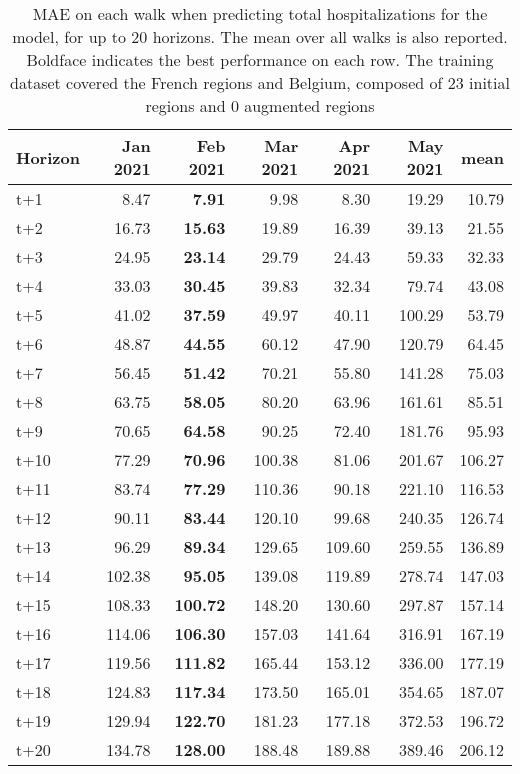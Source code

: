 \begin{table}[H]
\centering
\caption{MAE on each walk when predicting total hospitalizations for the model, for up to 20 horizons. The mean over all walks is also reported. Boldface indicates the best performance on each row. The training dataset covered the French regions and Belgium, composed of 23 initial regions and 0 augmented regions }
\label{tab:MAE_walk_baseline}
\begin{tabular}{lrrrrrr}
\toprule
Horizon &  Jan 2021 &  Feb 2021 &  Mar 2021 &  Apr 2021 &  May 2021 &   mean \\
\midrule
t+1  & 8.47  & \textbf{7.91}  & 9.98  & 8.30  & 19.29  & 10.79  \\
t+2  & 16.73  & \textbf{15.63}  & 19.89  & 16.39  & 39.13  & 21.55  \\
t+3  & 24.95  & \textbf{23.14}  & 29.79  & 24.43  & 59.33  & 32.33  \\
t+4  & 33.03  & \textbf{30.45}  & 39.83  & 32.34  & 79.74  & 43.08  \\
t+5  & 41.02  & \textbf{37.59}  & 49.97  & 40.11  & 100.29  & 53.79  \\
t+6  & 48.87  & \textbf{44.55}  & 60.12  & 47.90  & 120.79  & 64.45  \\
t+7  & 56.45  & \textbf{51.42}  & 70.21  & 55.80  & 141.28  & 75.03  \\
t+8  & 63.75  & \textbf{58.05}  & 80.20  & 63.96  & 161.61  & 85.51  \\
t+9  & 70.65  & \textbf{64.58}  & 90.25  & 72.40  & 181.76  & 95.93  \\
t+10  & 77.29  & \textbf{70.96}  & 100.38  & 81.06  & 201.67  & 106.27  \\
t+11  & 83.74  & \textbf{77.29}  & 110.36  & 90.18  & 221.10  & 116.53  \\
t+12  & 90.11  & \textbf{83.44}  & 120.10  & 99.68  & 240.35  & 126.74  \\
t+13  & 96.29  & \textbf{89.34}  & 129.65  & 109.60  & 259.55  & 136.89  \\
t+14  & 102.38  & \textbf{95.05}  & 139.08  & 119.89  & 278.74  & 147.03  \\
t+15  & 108.33  & \textbf{100.72}  & 148.20  & 130.60  & 297.87  & 157.14  \\
t+16  & 114.06  & \textbf{106.30}  & 157.03  & 141.64  & 316.91  & 167.19  \\
t+17  & 119.56  & \textbf{111.82}  & 165.44  & 153.12  & 336.00  & 177.19  \\
t+18  & 124.83  & \textbf{117.34}  & 173.50  & 165.01  & 354.65  & 187.07  \\
t+19  & 129.94  & \textbf{122.70}  & 181.23  & 177.18  & 372.53  & 196.72  \\
t+20  & 134.78  & \textbf{128.00}  & 188.48  & 189.88  & 389.46  & 206.12  \\

\bottomrule
\end{tabular}
\end{table}
